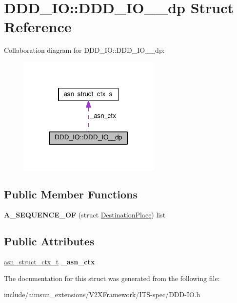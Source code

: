 \hypertarget{structDDD__IO_1_1DDD__IO____dp}{}\section{D\+D\+D\+\_\+\+IO\+:\+:D\+D\+D\+\_\+\+I\+O\+\_\+\+\_\+dp Struct Reference}
\label{structDDD__IO_1_1DDD__IO____dp}


Collaboration diagram for D\+D\+D\+\_\+\+IO\+:\+:D\+D\+D\+\_\+\+I\+O\+\_\+\+\_\+dp\+:\nopagebreak
\begin{figure}[H]
\begin{center}
\leavevmode
\includegraphics[width=200pt]{structDDD__IO_1_1DDD__IO____dp__coll__graph}
\end{center}
\end{figure}
\subsection*{Public Member Functions}
\begin{DoxyCompactItemize}
\item 
{\bfseries A\+\_\+\+S\+E\+Q\+U\+E\+N\+C\+E\+\_\+\+OF} (struct \hyperlink{structDestinationPlace}{Destination\+Place}) list\hypertarget{structDDD__IO_1_1DDD__IO____dp_ab1079ae95a25d8a678df8c0d0f6703bc}{}\label{structDDD__IO_1_1DDD__IO____dp_ab1079ae95a25d8a678df8c0d0f6703bc}

\end{DoxyCompactItemize}
\subsection*{Public Attributes}
\begin{DoxyCompactItemize}
\item 
\hyperlink{structasn__struct__ctx__s}{asn\+\_\+struct\+\_\+ctx\+\_\+t} {\bfseries \+\_\+asn\+\_\+ctx}\hypertarget{structDDD__IO_1_1DDD__IO____dp_a48dcdc4ccc50ff1539f9c7914ca7c1ee}{}\label{structDDD__IO_1_1DDD__IO____dp_a48dcdc4ccc50ff1539f9c7914ca7c1ee}

\end{DoxyCompactItemize}


The documentation for this struct was generated from the following file\+:\begin{DoxyCompactItemize}
\item 
include/aimsun\+\_\+extensions/\+V2\+X\+Framework/\+I\+T\+S-\/spec/D\+D\+D-\/\+I\+O.\+h\end{DoxyCompactItemize}
